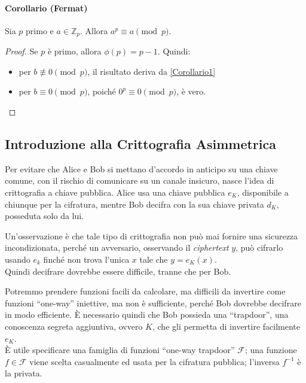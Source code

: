 \paragraph{Corollario (Fermat)} Sia $p$ primo e $a \in \mathbb{Z}_p$. Allora $a^p \equiv a \pmod p$. 

\begin{proof}
    Se $p$ è primo, allora $\phi(p)=p-1$. Quindi:
    \begin{itemize}
        \item per $b \not \equiv 0 \pmod p$, il risultato deriva da \ref{Corollario1}
        \item per $b \equiv 0 \pmod p$, poiché $0^p \equiv 0 \pmod p$, è vero.
    \end{itemize}
\end{proof}

\subsection{Introduzione alla Crittografia Asimmetrica}
Per evitare che Alice e Bob si mettano d'accordo in anticipo su una chiave comune, con il rischio di comunicare su un canale insicuro, nasce l'idea di crittografia a chiave pubblica. Alice usa una chiave pubblica $e_K$, disponibile a chiunque per la cifratura, mentre Bob decifra con la sua chiave privata $d_K$, posseduta solo da lui.

\vspace{0.2cm} \noindent Un'osservazione è che tale tipo di crittografia non può mai fornire una sicurezza incondizionata, perché un avversario, osservando il \emph{ciphertext} $y$, può cifrarlo usando $e_k$ finché non trova l'unica $x$ tale che $y=e_K(x)$.\\ Quindi decifrare dovrebbe essere difficile, tranne che per Bob.

\vspace{0.2cm} \noindent Potremmo prendere funzioni facili da calcolare, ma difficili da invertire come funzioni ``one-way'' iniettive, ma non è sufficiente, perché Bob dovrebbe decifrare in modo efficiente. È necessario quindi che Bob possieda una ``trapdoor'', una conoscenza segreta aggiuntiva, ovvero $K$, che gli permetta di invertire facilmente $e_K$. \\ È utile specificare una famiglia di funzioni ``one-way trapdoor'' $\mathcal{F}$; una funzione $f \in \mathcal{F}$ viene scelta casualmente ed usata per la cifratura pubblica; l'inversa $f^{-1}$ è la privata. 


